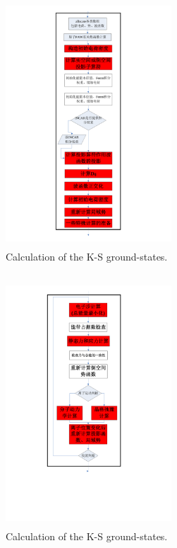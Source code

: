 \documentclass[cjk,slidestop,compress,mathserif,blue]{beamer}
\begin{document}
\frame
{
\frametitle{}
\begin{figure}[h!]
\centering
\vspace*{-0.65in}
\includegraphics[height=3.62in,width=2.45in,viewport=176 16 416 819,clip]{Figures/VASP_main_Flow-2.pdf}
\caption{\tiny \textrm{Calculation of the K-S ground-states.}}%
\label{VASP_Follow-2}
\end{figure}
}

\frame
{
\frametitle{}
\begin{figure}[h!]
\centering
\vspace*{-0.65in}
\includegraphics[height=3.62in,width=2.45in,viewport=146 173 416 812,clip]{Figures/VASP_main_Flow-3.pdf}
\caption{\tiny \textrm{Calculation of the K-S ground-states.}}%
\label{VASP_Follow-3}
\end{figure}
}
\end{document}
